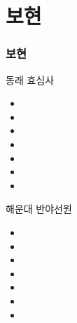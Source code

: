 \documentclass[aspectratio=1610,20pt,xcolor=pdftex,dvipsnames,table,handout]{beamer}
\begin{document}
		\section{보현}
		\begin{frame} [t,plain]
		\frametitle{보현}

			\begin{block} {동래 효심사}
			\setlength{\leftmargini}{1em}			
			\begin{itemize}
				\item 	\hrulefill
				\item 	\hrulefill
				\item 	\hrulefill
				\item 	\hrulefill
				\item 	\hrulefill
				\item 	\hrulefill
				\item 	\hrulefill
			\end{itemize}
			\end{block}			
								
			\begin{block} {해운대 반야선원}
			\setlength{\leftmargini}{1em}			
			\begin{itemize}
				\item 	\hrulefill
				\item 	\hrulefill
				\item 	\hrulefill
				\item 	\hrulefill
				\item 	\hrulefill
				\item 	\hrulefill
				\item 	\hrulefill
			\end{itemize}
			\end{block}			

		\end{frame}						


\end{document}
